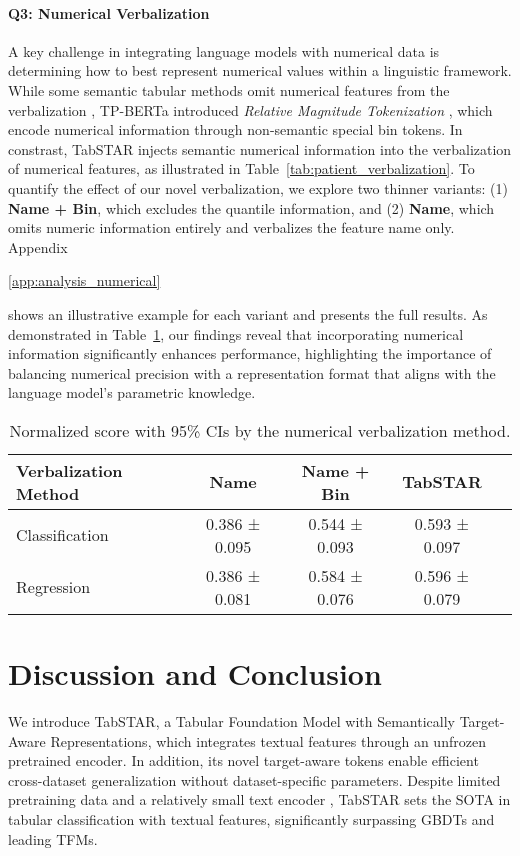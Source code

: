\documentclass{article}
\newif\ifappendicesincluded
\newcommand{\appref}[1]{%
  \ifappendicesincluded
    \ref{#1}%
  \else
    \ref*{#1}%
  \fi
}
\begin{document}
\paragraph{Q3: Numerical Verbalization} \label{par:numerical-verbalization}
A key challenge in integrating language models with numerical data is determining how to best represent numerical values within a linguistic framework. While some semantic tabular methods omit numerical features from the verbalization \cite{wang_transtab_2022, ye_towards_2024}, TP-BERTa \cite{yan_making_2023} introduced \textit{Relative Magnitude Tokenization} \cite{yan_making_2023}, which encode numerical information through non-semantic special bin tokens. In constrast, TabSTAR injects semantic numerical information into the verbalization of numerical features, as illustrated in Table~\ref{tab:patient_verbalization}. To quantify the effect of our novel verbalization, we explore two thinner variants: (1) \textbf{Name + Bin}, which excludes the quantile information, and (2) \textbf{Name}, which omits numeric information entirely and verbalizes the feature name only. Appendix~\appref{app:analysis_numerical} shows an illustrative example for each variant and presents the full results. As demonstrated in Table~\ref{tab:exp_verbalization}, our findings reveal that incorporating numerical information significantly enhances performance, highlighting the importance of balancing numerical precision with a representation format that aligns with the language model’s parametric knowledge.

\begin{table}[ht]
\centering
\caption{Normalized score with 95\% CIs by the numerical verbalization method.}
\label{tab:exp_verbalization}
\begin{tabular}{lcccc}
\toprule
Verbalization Method & Name  & Name + Bin     & TabSTAR  \\
\midrule
Classification   & 0.386 ± 0.095 & 0.544 ± 0.093  & 0.593 ± 0.097   \\
Regression  & 0.386 ± 0.081 & 0.584 ± 0.076 & 0.596 ± 0.079 \\
\bottomrule
\end{tabular}
\end{table}

\section{Discussion and Conclusion}
\label{sec:discussion}
We introduce TabSTAR, a Tabular Foundation Model with Semantically Target-Aware Representations, which integrates textual features through an unfrozen pretrained encoder. In addition, its novel target-aware tokens enable efficient cross-dataset generalization without dataset-specific parameters. Despite limited pretraining data and a relatively small text encoder \cite{wang_text_2024}, TabSTAR sets the SOTA in tabular classification with textual features, significantly surpassing GBDTs and leading TFMs. 
\end{document}
